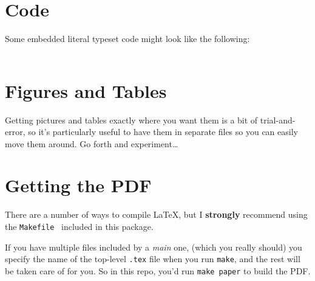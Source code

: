 \documentclass[letterpaper,twocolumn,10pt,final]{article}
\begin{document}
\section{\label{sec:code}Code}
Some embedded literal typeset code might look like the following:
\\ %
\texttt{
    \small
}


\section{\label{sec:ft}Figures and Tables}
Getting pictures and tables exactly where you want them is a bit of trial-and-error, so it's particularly useful to have them in separate files so you can easily move them around. Go forth and experiment\ldots





\section{\label{sec:tex}Getting the PDF}
There are a number of ways to compile LaTeX, but I \textbf{strongly} recommend using the \texttt{Makefile}~\cite{latex-makefile} included in this package.

If you have multiple files included by a \textit{main} one, (which you really should) you specify the name of the top-level \texttt{.tex} file when you run \texttt{make}, and the rest will be taken care of for you. So in this repo, you'd run \texttt{make paper} to build the PDF.

{\footnotesize 
    
    
}

\theendnotes
\end{document}
